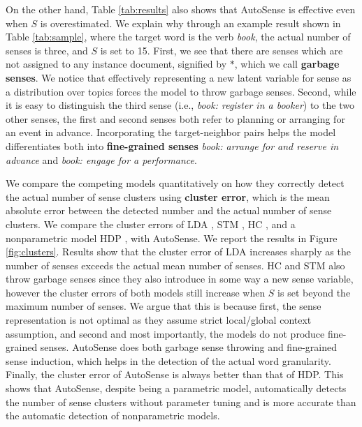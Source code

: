 \documentclass[letterpaper]{article} %
\begin{document}
On the other hand, Table \ref{tab:results} also shows that AutoSense is effective even when $S$ is overestimated. We explain why through an example result shown in Table \ref{tab:sample}, where the target word is the verb \textit{book}, the actual number of senses is three, and $S$ is set to 15. First, we see that there are senses which are not assigned to any instance document, signified by $*$, which we call \textbf{garbage senses}. We notice that effectively representing a new latent variable for sense as a distribution over topics forces the model to throw garbage senses. Second, while it is easy to distinguish the third sense (i.e., \textit{book: register in a booker}) to the two other senses, the first and second senses both refer to planning or arranging for an event in advance. Incorporating the target-neighbor pairs helps the model differentiates both into \textbf{fine-grained senses} \textit{book: arrange for and reserve in advance} and \textit{book: engage for a performance}.

We compare the competing models quantitatively on how they correctly detect the actual number of sense clusters using \textbf{cluster error}, which is the mean absolute error between the detected number and the actual number of sense clusters. We compare the cluster errors of LDA \cite{blei2003latent}, STM \cite{wang2015sense}, HC \cite{chang2014inducing}, and a nonparametric model HDP \cite{teh2004sharing}, with AutoSense. We report the results in Figure \ref{fig:clusters}. Results show that the cluster error of LDA increases sharply as the number of senses exceeds the actual mean number of senses. HC and STM also throw garbage senses since they also introduce in some way a new sense variable, however the cluster errors of both models still increase when $S$ is set beyond the maximum number of senses. We argue that this is because first, the sense representation is not optimal as they assume strict local/global context assumption, and second and most importantly, the models do not produce fine-grained senses. AutoSense does both garbage sense throwing and fine-grained sense induction, which helps in the detection of the actual word granularity. Finally, the cluster error of AutoSense is always better than that of HDP. This shows that AutoSense, despite being a parametric model, automatically detects the number of sense clusters without parameter tuning and is more accurate than the automatic detection of nonparametric models.
\end{document}
